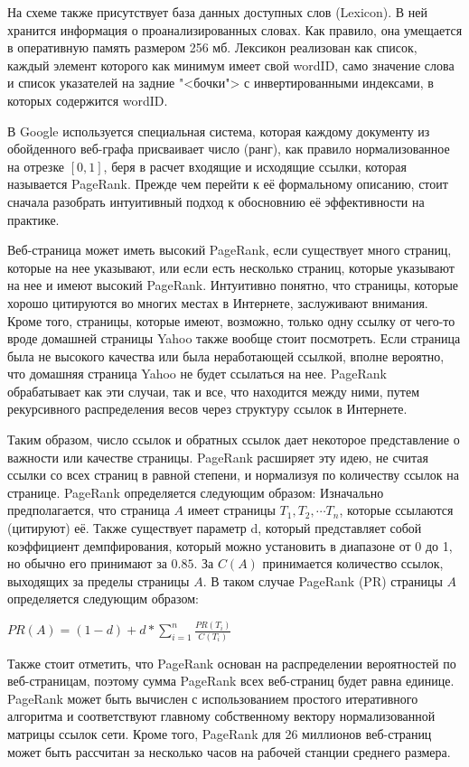На схеме также присутствует база данных доступных слов (Lexicon). В ней хранится информация о проанализированных словах. Как правило, она умещается в оперативную память размером 256 мб. Лексикон реализован как список, каждый элемент которого как минимум имеет свой wordID, само значение слова и список указателей на задние "<бочки"> с инвертированными индексами, в которых содержится wordID.

В Google используется специальная система, которая каждому документу из обойденного веб-графа присваивает число (ранг), как правило нормализованное на отрезке $[0, 1]$, беря в расчет входящие и исходящие ссылки, которая называется PageRank. Прежде чем перейти к её формальному описанию, стоит сначала разобрать интуитивный подход к обосновнию её эффективности на практике. 

Веб-страница может иметь высокий PageRank, если существует много страниц, которые на нее указывают, или если есть несколько страниц, которые указывают на нее и имеют высокий PageRank. Интуитивно понятно, что страницы, которые хорошо цитируются во многих местах в Интернете, заслуживают внимания. Кроме того, страницы, которые имеют, возможно, только одну ссылку от чего-то вроде домашней страницы Yahoo  также вообще стоит посмотреть. Если страница была не высокого качества или была неработающей ссылкой, вполне вероятно, что домашняя страница Yahoo не будет ссылаться на нее. PageRank обрабатывает как эти случаи, так и все, что находится между ними, путем рекурсивного распределения весов через структуру ссылок в Интернете.

Таким образом, число ссылок и обратных ссылок дает некоторое представление о важности или качестве страницы. PageRank расширяет эту идею, не считая ссылки со всех страниц в равной степени, и нормализуя по количеству ссылок на странице. PageRank определяется следующим образом:
Изначально предполагается, что страница $A$ имеет страницы $T_1, T_2, \cdots T_n$, которые ссылаются (цитируют) её. Также существует параметр d, который представляет собой коэффициент демпфирования, который можно установить в диапазоне от 0 до 1, но обычно его принимают за $0.85$. За $C(A)$ принимается количество ссылок, выходящих за пределы страницы $A$. В таком случае PageRank (PR) страницы $A$ определяется следующим образом:

\begin{center}
$PR(A) = (1 - d) + d * \sum_{i = 1}^{n}\frac{PR(T_i)}{C(T_i)}$
\end{center}

Также стоит отметить, что PageRank основан на распределении вероятностей по веб-страницам, поэтому сумма PageRank всех веб-страниц будет равна единице. PageRank может быть вычислен с использованием простого итеративного алгоритма и соответствуют главному собственному вектору нормализованной матрицы ссылок сети. Кроме того, PageRank для 26 миллионов веб-страниц может быть рассчитан за несколько часов на рабочей станции среднего размера. 

